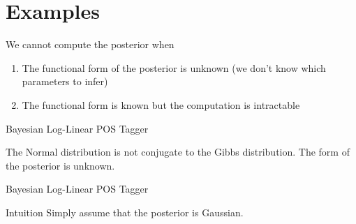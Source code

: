 \documentclass[14pt]{beamer}
\begin{document}
\section{Examples}
\frame{\tableofcontents[currentsection]}

\begin{frame}{We cannot compute the posterior when}
\begin{enumerate}
\item The functional form of the posterior is unknown (we don't know which parameters to infer)
\item The functional form is known but the computation is intractable
\end{enumerate}
\end{frame}

\begin{frame}{Bayesian Log-Linear POS Tagger}
\begin{figure}
\end{figure}
The Normal distribution is not conjugate to the Gibbs distribution. The form of the posterior is unknown.
\end{frame}

\begin{frame}{Bayesian Log-Linear POS Tagger}
\begin{block}{Intuition}
Simply assume that the posterior is Gaussian.
\end{block}
\end{frame}
\end{document}
